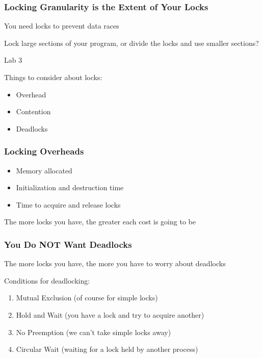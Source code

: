   \begin{frame}
    \frametitle{Locking Granularity is the Extent of Your Locks}

    You need locks to prevent data races

    \vspace{2em}

    Lock large sections of your program, or divide the locks and
    use smaller sections?

    \hspace{2em} Lab 3

    \vspace{2em}
    
    Things to consider about locks:

    \begin{itemize}
     \item Overhead
      \item Contention
      \item Deadlocks
    \end{itemize}
  \end{frame}

  \begin{frame}
    \frametitle{Locking Overheads}

    \begin{itemize}
      \item Memory allocated
      \item Initialization and destruction time
      \item Time to acquire and release locks
    \end{itemize}

    \vspace{2em}

    The more locks you have, the greater each cost is going to be
  \end{frame}

  \begin{frame}
    \frametitle{You Do NOT Want Deadlocks}

    The more locks you have, the more you have to worry about deadlocks

    \vspace{2em}

    Conditions for deadlocking:

    \begin{enumerate}
      \item Mutual Exclusion (of course for simple locks)
      \item Hold and Wait (you have a lock and try to acquire another)
      \item No Preemption (we can't take simple locks away)
      \item Circular Wait (waiting for a lock held by another process)
    \end{enumerate}
  \end{frame}

